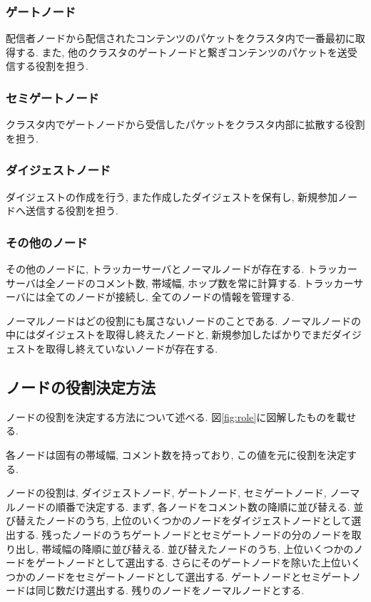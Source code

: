\subsubsection{ゲートノード}
配信者ノードから配信されたコンテンツのパケットをクラスタ内で一番最初に取得する. また, 他のクラスタのゲートノードと繋ぎコンテンツのパケットを送受信する役割を担う.

\subsubsection{セミゲートノード}
クラスタ内でゲートノードから受信したパケットをクラスタ内部に拡散する役割を担う.

\subsubsection{ダイジェストノード}
ダイジェストの作成を行う, また作成したダイジェストを保有し, 新規参加ノードへ送信する役割を担う.

\subsubsection{その他のノード}
その他のノードに, トラッカーサーバとノーマルノードが存在する. トラッカーサーバは全ノードのコメント数, 帯域幅, ホップ数を常に計算する. トラッカーサーバには全てのノードが接続し, 全てのノードの情報を管理する.

ノーマルノードはどの役割にも属さないノードのことである. ノーマルノードの中にはダイジェストを取得し終えたノードと, 新規参加したばかりでまだダイジェストを取得し終えていないノードが存在する.

\subsection{ノードの役割決定方法}
ノードの役割を決定する方法について述べる. 図\ref{fig:role}に図解したものを載せる.

各ノードは固有の帯域幅, コメント数を持っており, この値を元に役割を決定する.

ノードの役割は, ダイジェストノード, ゲートノード, セミゲートノード, ノーマルノードの順番で決定する. まず, 各ノードをコメント数の降順に並び替える. 並び替えたノードのうち, 上位のいくつかのノードをダイジェストノードとして選出する. 残ったノードのうちゲートノードとセミゲートノードの分のノードを取り出し, 帯域幅の降順に並び替える. 並び替えたノードのうち, 上位いくつかのノードをゲートノードとして選出する. さらにそのゲートノードを除いた上位いくつかのノードをセミゲートノードとして選出する. ゲートノードとセミゲートノードは同じ数だけ選出する. 残りのノードをノーマルノードとする.

